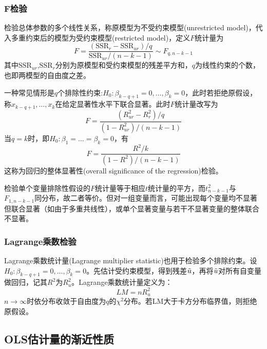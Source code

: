 \subsubsection{F检验}
\par 检验总体参数的多个线性关系，称原模型为不受约束模型(unrestricted model)，代入多重约束后的模型为受约束模型(restricted model)，定义$F$统计量为
\begin{equation}
    F=\frac{(\text{SSR}_r-\text{SSR}_{ur})/q}{\text{SSR}_{ur}/(n-k-1)}\sim F_{q,n-k-1}
\end{equation}
其中$\text{SSR}_{ur}$,$\text{SSR}_{r}$分别为原模型和受约束模型的残差平方和，$q$为线性约束的个数，也即两模型的自由度之差。
\par 一种常见情形是$q$个排除性约束:$H_0:\beta_{k-q+1}=0,\dots,\beta_{k}=0$，此时若拒绝原假设，称$x_{k-q+1},\dots,x_{k}$在给定显著性水平下联合显著。此时$F$统计量改写为
\begin{equation}
    F=\frac{(R_{ur}^2-R_{r}^2)/q}{(1-R_{ur}^2)/(n-k-1)}
\end{equation}
当$q=k$时，即$H_0:\beta_1=\dots=\beta_k=0$，有
\begin{equation}
    F=\frac{R^2/k}{(1-R^2)/(n-k-1)}
\end{equation}
这称为回归的整体显著性(overall significance of the regression)检验。

\par 检验单个变量排除性假设的$F$统计量等于相应$t$统计量的平方，而$t_{n-k-1}^2$与$F_{1,n-k-1}$同分布，故二者等价。但对一组变量而言，可能出现每个变量均不显著但联合显著（如由于多重共线性），或单个显著变量与若干不显著变量的整体联合不显著。

\subsubsection{Lagrange乘数检验}

\par Lagrange乘数统计量(Lagrange multiplier statistic)也用于检验多个排除约束。设$H_0:\beta_{k-q+1}=0,\dots,\beta_{k}=0$。先估计受约束模型，得到残差$\Tilde{u}$，再将$\Tilde{u}$对所有自变量做回归，记其$R^2$为$R_u^2$。Lagrange乘数统计量定义为：
\begin{equation}
    LM=nR_u^2
\end{equation}
$n\to \infty$时依分布收敛于自由度为$q$的$\chi^2$分布。若LM大于卡方分布临界值，则拒绝原假设。

\subsection{OLS估计量的渐近性质}

